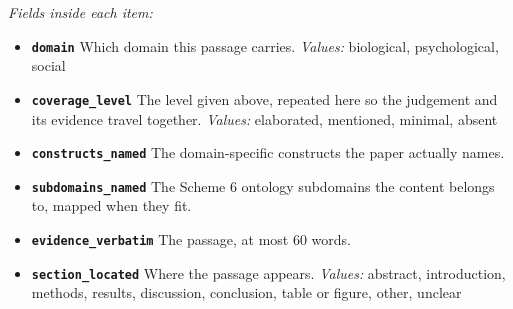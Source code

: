 \documentclass[11pt]{article}
\begin{document}
\begin{description}
  {\small\itshape Fields inside each item:}
  \begin{itemize}[leftmargin=1.3em,itemsep=1pt,topsep=2pt]
  \item \textbf{\texttt{domain}} Which domain this passage carries. {\small \textit{Values:} biological, psychological, social}
  \item \textbf{\texttt{coverage\_level}} The level given above, repeated here so the judgement and its evidence travel together. {\small \textit{Values:} elaborated, mentioned, minimal, absent}
  \item \textbf{\texttt{constructs\_named}} The domain-specific constructs the paper actually names.
  \item \textbf{\texttt{subdomains\_named}} The Scheme 6 ontology subdomains the content belongs to, mapped when they fit.
  \item \textbf{\texttt{evidence\_verbatim}} The passage, at most 60 words.
  \item \textbf{\texttt{section\_located}} Where the passage appears. {\small \textit{Values:} abstract, introduction, methods, results, discussion, conclusion, table or figure, other, unclear}
  \end{itemize}
\end{description}
\end{document}
